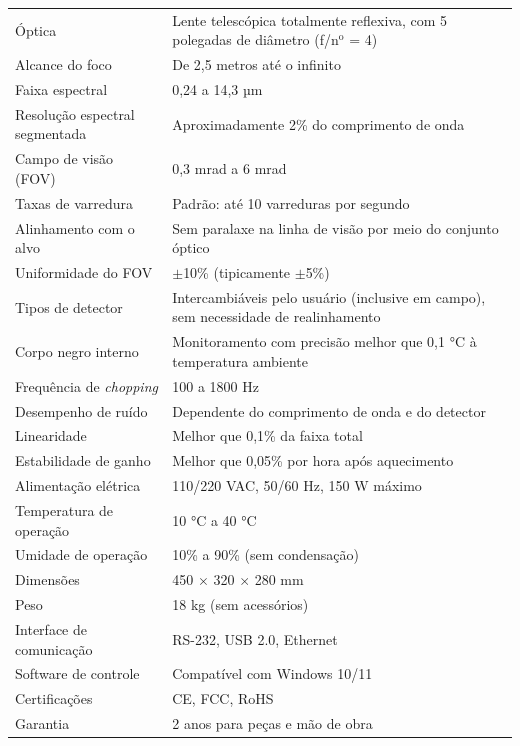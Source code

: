 \begin{longtable}{p{} p{}}
Óptica & Lente telescópica totalmente reflexiva, com 5 polegadas de diâmetro (f/n$^{\text{o}}$ = 4) \\
Alcance do foco & De 2,5 metros até o infinito \\
Faixa espectral & 0,24 a 14,3 µm \\
Resolução espectral segmentada & Aproximadamente 2\% do comprimento de onda \\
Campo de visão (FOV) & 0,3 mrad a 6 mrad \\
Taxas de varredura & Padrão: até 10 varreduras por segundo \\
Alinhamento com o alvo & Sem paralaxe na linha de visão por meio do conjunto óptico \\
Uniformidade do FOV & $\pm$10\% (tipicamente $\pm$5\%) \\
Tipos de detector & Intercambiáveis pelo usuário (inclusive em campo), sem necessidade de realinhamento \\
Corpo negro interno & Monitoramento com precisão melhor que 0,1 °C à temperatura ambiente \\
Frequência de \textit{chopping} & 100 a 1800 Hz \\
Desempenho de ruído & Dependente do comprimento de onda e do detector \\
Linearidade & Melhor que 0,1\% da faixa total \\
Estabilidade de ganho & Melhor que 0,05\% por hora após aquecimento \\
Alimentação elétrica & 110/220 VAC, 50/60 Hz, 150 W máximo \\
Temperatura de operação & 10 °C a 40 °C \\
Umidade de operação & 10\% a 90\% (sem condensação) \\
Dimensões & 450 $\times$ 320 $\times$ 280 mm \\
Peso & 18 kg (sem acessórios) \\
Interface de comunicação & RS-232, USB 2.0, Ethernet \\
Software de controle & Compatível com Windows 10/11 \\
Certificações & CE, FCC, RoHS \\
Garantia & 2 anos para peças e mão de obra \\

\end{longtable}
